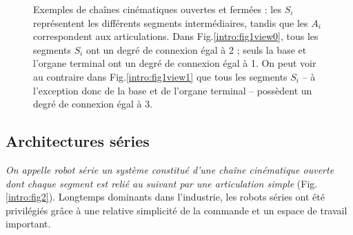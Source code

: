 \begin{figure}[!ht]
  \centering
\hfill
    \caption{\footnotesize{Exemples de cha\^ines cinématiques ouvertes et 
fermées : les $S_i$ représentent les différents segments intermédiaires, tandis 
que les $A_i$ correspondent aux articulations. Dans Fig.\ref{intro:fig1view0}, 
tous les segments $S_i$ ont un degré de connexion égal à 2 ; seuls la base et 
l'organe terminal ont un degré de connexion égal à 1. On peut voir au 
contraire dans Fig.\ref{intro:fig1view1} que tous les segments $S_i$ -- \`a 
l'exception donc de la base et de l'organe terminal -- possèdent un degré de 
connexion \'egal à 3.}}
\label{intro:fig1}
\end{figure}

\subsection{Architectures séries} \label{chap0-0-1}

{\it On appelle robot série un système constitué d'une chaîne cinématique 
ouverte dont chaque segment est relié au suivant par une articulation simple} 
(Fig.\ref{intro:fig2}). Longtemps dominants dans l'industrie, les robots séries 
ont été privilégiés grâce à une relative simplicité de la commande et un espace 
de travail important.


